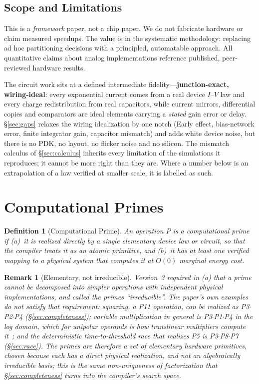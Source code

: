 \documentclass[11pt]{article}
\newtheorem{definition}{Definition}
\newtheorem{remark}{Remark}
\begin{document}
\subsection{Scope and Limitations}

This is a \textit{framework} paper, not a chip paper. We do not fabricate hardware or claim measured speedups. The value is in the systematic methodology: replacing ad hoc partitioning decisions with a principled, automatable approach. All quantitative claims about analog implementations reference published, peer-reviewed hardware results.

The circuit work sits at a defined intermediate fidelity---\textbf{junction-exact, wiring-ideal}: every exponential current comes from a real device $I$--$V$ law and every charge redistribution from real capacitors, while current mirrors, differential copies and comparators are ideal elements carrying a \textit{stated} gain error or delay. \S\ref{sec:gaps} relaxes the wiring idealization by one notch (Early effect, bias-network error, finite integrator gain, capacitor mismatch) and adds white device noise, but there is no PDK, no layout, no flicker noise and no silicon. The mismatch calculus of \S\ref{sec:calculus} inherits every limitation of the simulations it reproduces; it cannot be more right than they are. Where a number below is an extrapolation of a law verified at smaller scale, it is labelled as such.

\section{Computational Primes}
\label{sec:primes}

\begin{definition}[Computational Prime]
An operation $P$ is a computational prime if (a)~it is realized directly by a single elementary device law or circuit, so that the compiler treats it as an atomic primitive, and (b)~it has at least one verified mapping to a physical system that computes it at $O(0)$ marginal energy cost.
\end{definition}

\begin{remark}[Elementary, not irreducible]
Version~3 required in (a) that a prime cannot be decomposed into simpler operations with independent physical implementations, and called the primes ``irreducible''. The paper's own examples do not satisfy that requirement: squaring, a P11 operation, can be realized as P3$\cdot$P2$\cdot$P4 (\S\ref{sec:completeness}); variable multiplication in general is P3$\cdot$P1$\cdot$P4 in the log domain, which for unipolar operands is how translinear multipliers compute it~\cite{gilbert1975}; and the deterministic time-to-threshold race that realizes P5 is P3$\cdot$P8$\cdot$P7 (\S\ref{sec:race}). The primes are therefore a set of elementary hardware primitives, chosen because each has a direct physical realization, and not an algebraically irreducible basis; this is the same non-uniqueness of factorization that \S\ref{sec:completeness} turns into the compiler's search space.
\end{remark}
\end{document}
